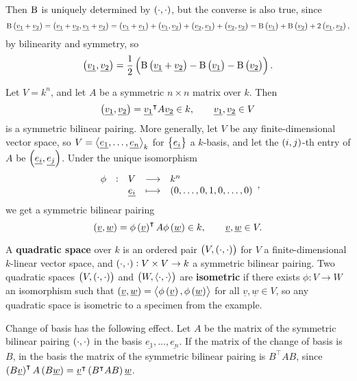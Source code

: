 \begin{remark}
Then $ \mathrm{B} $ is uniquely determined by $ \br{\cdot, \cdot} $, but the converse is also true, since
$$ \B\br{\underline{v_1} + \underline{v_2}} = \br{\underline{v_1} + \underline{v_2}, \underline{v_1} + \underline{v_2}} = \br{\underline{v_1} + \underline{v_1}} + \br{\underline{v_1}, \underline{v_2}} + \br{\underline{v_2}, \underline{v_1}} + \br{\underline{v_2}, \underline{v_2}} = \B\br{\underline{v_1}} + \B\br{\underline{v_2}} + 2\br{\underline{v_1}, \underline{v_2}}, $$
by bilinearity and symmetry, so
$$ \br{\underline{v_1}, \underline{v_2}} = \dfrac{1}{2}\br{\B\br{\underline{v_1} + \underline{v_2}} - \B\br{\underline{v_1}} - \B\br{\underline{v_2}}}. $$
\end{remark}

\begin{example}
Let $ V = k^n $, and let $ A $ be a symmetric $ n \times n $ matrix over $ k $. Then
$$ \br{\underline{v_1}, \underline{v_2}} = \underline{v_1}^\intercal A\underline{v_2} \in k, \qquad \underline{v_1}, \underline{v_2} \in V $$
is a symmetric bilinear pairing. More generally, let $ V $ be any finite-dimensional vector space, so $ V = \left\langle \underline{e_1}, \dots, \underline{e_n} \right\rangle_k $ for $ \cbr{\underline{e_i}} $ a $ k $-basis, and let the $ \br{i, j} $-th entry of $ A $ be $ \br{\underline{e_i}, \underline{e_j}} $. Under the unique isomorphism
$$ \function[\phi]{V}{k^n}{\underline{e_i}}{\br{0, \dots, 0, 1, 0, \dots, 0}}, $$
we get a symmetric bilinear pairing
$$ \br{\underline{v}, \underline{w}} = \phi\br{\underline{v}}^\intercal A\phi\br{\underline{w}} \in k, \qquad \underline{v}, \underline{w} \in V. $$
\end{example}

\begin{definition}
A \textbf{quadratic space} over $ k $ is an ordered pair $ \br{V, \br{\cdot, \cdot}} $ for $ V $ a finite-dimensional $ k $-linear vector space, and $ \br{\cdot, \cdot} : V \times V \to k $ a symmetric bilinear pairing. Two quadratic spaces $ \br{V, \br{\cdot, \cdot}} $ and $ \br{W, \abr{\cdot, \cdot}} $ are \textbf{isometric} if there exists $ \phi : V \to W $ an isomorphism such that $ \br{\underline{v}, \underline{w}} = \abr{\phi\br{\underline{v}}, \phi\br{\underline{w}}} $ for all $ \underline{v}, \underline{w} \in V $, so any quadratic space is isometric to a specimen from the example.
\end{definition}

\begin{remark}
Change of basis has the following effect. Let $ A $ be the matrix of the symmetric bilinear pairing $ \br{\cdot, \cdot} $ in the basis $ \underline{e_1}, \dots, \underline{e_n} $. If the matrix of the change of basis is $ B $, in the basis the matrix of the symmetric bilinear pairing is $ B^\intercal AB $, since $ \br{B\underline{v}}^\intercal A\br{B\underline{w}} = \underline{v}^\intercal \br{B^\intercal AB}\underline{w} $.
\end{remark}

